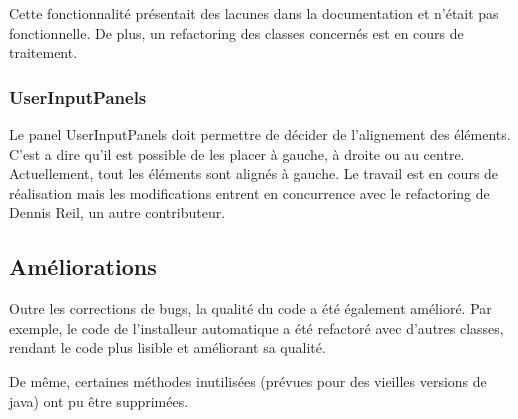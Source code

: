 Cette fonctionnalité présentait des lacunes dans la documentation et n'était pas fonctionnelle.
De plus, un refactoring des classes concernés est en cours de traitement.
\subsubsection{UserInputPanels}
Le panel UserInputPanels doit permettre de décider de l'alignement des éléments.
C'est a dire qu'il est possible de les placer à gauche, à droite ou au centre. Actuellement, tout les éléments sont alignés à gauche.
Le travail est en cours de réalisation mais les modifications entrent en concurrence avec le refactoring de Dennis Reil, un autre contributeur.

\subsection{Améliorations}
Outre les corrections de bugs, la qualité du code a été également amélioré.
Par exemple, le code de l'installeur automatique a été refactoré avec d'autres classes, rendant le code plus lisible et améliorant sa qualité.

De même, certaines méthodes inutilisées (prévues pour des vieilles versions de java) ont pu être supprimées.